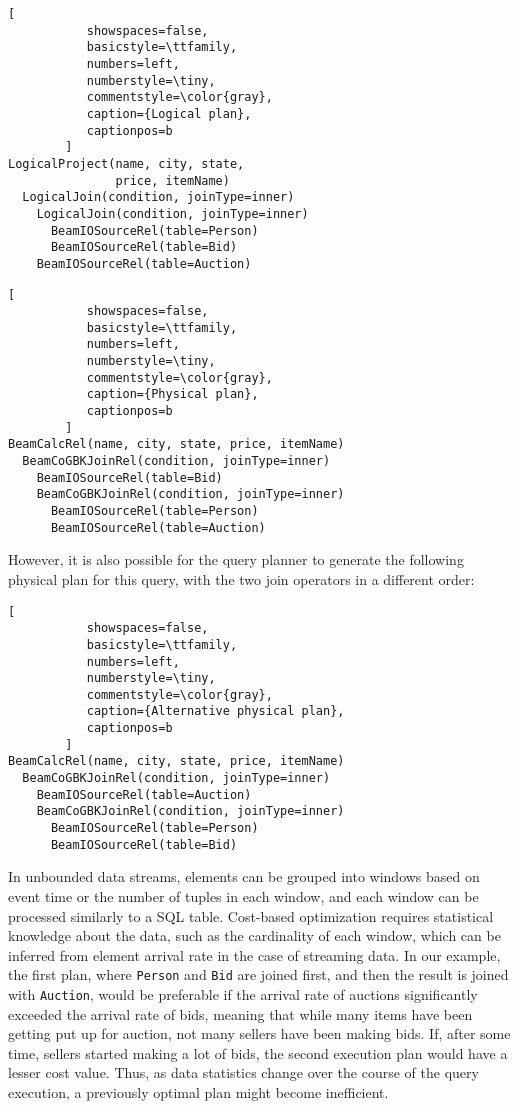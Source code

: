 \begin{lstlisting}[
           showspaces=false,
           basicstyle=\ttfamily,
           numbers=left,
           numberstyle=\tiny,
           commentstyle=\color{gray},
           caption={Logical plan}, 
           captionpos=b
        ]
LogicalProject(name, city, state, 
               price, itemName)
  LogicalJoin(condition, joinType=inner) 
    LogicalJoin(condition, joinType=inner)
      BeamIOSourceRel(table=Person)
      BeamIOSourceRel(table=Bid)
    BeamIOSourceRel(table=Auction)
\end{lstlisting}

\begin{lstlisting}[
           showspaces=false,
           basicstyle=\ttfamily,
           numbers=left,
           numberstyle=\tiny,
           commentstyle=\color{gray},
           caption={Physical plan}, 
           captionpos=b
        ]
BeamCalcRel(name, city, state, price, itemName)
  BeamCoGBKJoinRel(condition, joinType=inner)
    BeamIOSourceRel(table=Bid)
    BeamCoGBKJoinRel(condition, joinType=inner)
      BeamIOSourceRel(table=Person)
      BeamIOSourceRel(table=Auction)
\end{lstlisting}

However, it is also possible for the query planner to generate the following physical plan for this query, with the two join operators in a different order:

\begin{lstlisting}[
           showspaces=false,
           basicstyle=\ttfamily,
           numbers=left,
           numberstyle=\tiny,
           commentstyle=\color{gray},
           caption={Alternative physical plan}, 
           captionpos=b
        ]
BeamCalcRel(name, city, state, price, itemName)
  BeamCoGBKJoinRel(condition, joinType=inner)
    BeamIOSourceRel(table=Auction)
    BeamCoGBKJoinRel(condition, joinType=inner)
      BeamIOSourceRel(table=Person)
      BeamIOSourceRel(table=Bid)        
\end{lstlisting}


In unbounded data streams, elements can be grouped into windows based on event time or the number of tuples in each window, and each window can be processed similarly to a SQL table. Cost-based optimization requires statistical knowledge about the data, such as the cardinality of each window, which can be inferred from element arrival rate in the case of streaming data. In our example, the first plan, where \texttt{Person} and \texttt{Bid} are joined first, and then the result is joined with \texttt{Auction}, would be preferable if the arrival rate of auctions significantly exceeded the arrival rate of bids, meaning that while many items have been getting put up for auction, not many sellers have been making bids. If, after some time, sellers started making a lot of bids, the second execution plan would have a lesser cost value. Thus, as data statistics change over the course of the query execution, a previously optimal plan might become inefficient. 

